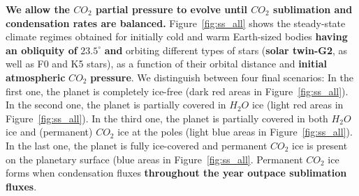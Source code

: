 \documentclass[fleqn,usenatbib]{mnras}
\providecommand{\DIFadd}[1]{{\bf #1}} %
\providecommand{\DIFdel}[1]{} %
\providecommand{\DIFaddbegin}{} %
\providecommand{\DIFaddend}{} %
\providecommand{\DIFdelbegin}{} %
\providecommand{\DIFdelend}{} %
\newcommand{\DIFscaledelfig}{0.5}
\newlength{\DIFdelgraphicswidth} %
\newlength{\DIFdelgraphicsheight} %
\newcommand{\DIFaddincludegraphics}[2][]{{\color{blue}\fbox{\DIFOincludegraphics[#1]{#2}}}} %
\newcommand{\DIFdelincludegraphics}[2][]{%
\sbox{\DIFdelgraphicsbox}{\DIFOincludegraphics[#1]{#2}}%
\settoboxwidth{\DIFdelgraphicswidth}{\DIFdelgraphicsbox} %
\settoboxtotalheight{\DIFdelgraphicsheight}{\DIFdelgraphicsbox} %
\scalebox{\DIFscaledelfig}{%
\parbox[b]{\DIFdelgraphicswidth}{\usebox{\DIFdelgraphicsbox}\\[-\baselineskip] \rule{\DIFdelgraphicswidth}{0em}}\llap{\resizebox{\DIFdelgraphicswidth}{\DIFdelgraphicsheight}{%
\setlength{\unitlength}{\DIFdelgraphicswidth}%
\begin{picture}(1,1)%
\thicklines\linethickness{2pt} %
{\color[rgb]{1,0,0}\put(0,0){\framebox(1,1){}}}%
{\color[rgb]{1,0,0}\put(0,0){\line( 1,1){1}}}%
{\color[rgb]{1,0,0}\put(0,1){\line(1,-1){1}}}%
\end{picture}%
}\hspace*{3pt}}} %
} %
\DeclareRobustCommand{\DIFaddbegin}{\DIFOaddbegin \let\includegraphics\DIFaddincludegraphics} %
\DeclareRobustCommand{\DIFaddend}{\DIFOaddend \let\includegraphics\DIFOincludegraphics} %
\DeclareRobustCommand{\DIFdelbegin}{\DIFOdelbegin \let\includegraphics\DIFdelincludegraphics} %
\DeclareRobustCommand{\DIFdelend}{\DIFOaddend \let\includegraphics\DIFOincludegraphics} %
\begin{document}
\DIFaddbegin \DIFadd{We allow the $CO_{\mathrm{2}}$ partial pressure to evolve until $CO_{\mathrm{2}}$ sublimation and condensation rates are balanced. }\DIFaddend Figure~\ref{fig:ss_all} shows the steady-state climate regimes obtained for initially cold and warm Earth-sized bodies \DIFdelbegin \DIFdel{with obliquity }\DIFdelend \DIFaddbegin \DIFadd{having an obliquity of }\DIFaddend $23.5^{\circ}$ \DIFaddbegin \DIFadd{and }\DIFaddend orbiting different types of stars (\DIFdelbegin \DIFdel{Sun-like}\DIFdelend \DIFaddbegin \DIFadd{solar twin-G2}\DIFaddend , as well as F0 and K5 stars), as a function of their orbital distance and \DIFdelbegin \DIFdel{the initial atmospheric pressure of }\DIFdelend \DIFaddbegin \DIFadd{initial atmospheric }\DIFaddend $CO_{\mathrm{2}}$ \DIFaddbegin \DIFadd{pressure}\DIFaddend .  We distinguish between four final scenarios: In the first one, the planet is completely ice-free (dark red areas in Figure~\ref{fig:ss_all}). In the second one, the planet is partially covered in $H_{\mathrm{2}}O$ ice (light red areas in Figure~\ref{fig:ss_all}). In the third one, the planet is partially covered in both $H_{\mathrm{2}}O$ ice and (permanent) $CO_{\mathrm{2}}$ ice at the poles (light blue areas in Figure~\ref{fig:ss_all}). In the last one, the planet is fully ice-covered and permanent $CO_{\mathrm{2}}$ ice is present on the planetary surface (blue areas in Figure~\ref{fig:ss_all}. Permanent $CO_{\mathrm{2}}$ ice forms when condensation fluxes \DIFdelbegin \DIFdel{during the winter months do not balance sublimation taking place in the summer}\DIFdelend \DIFaddbegin \DIFadd{throughout the year outpace sublimation fluxes}\DIFaddend . 
\end{document}
